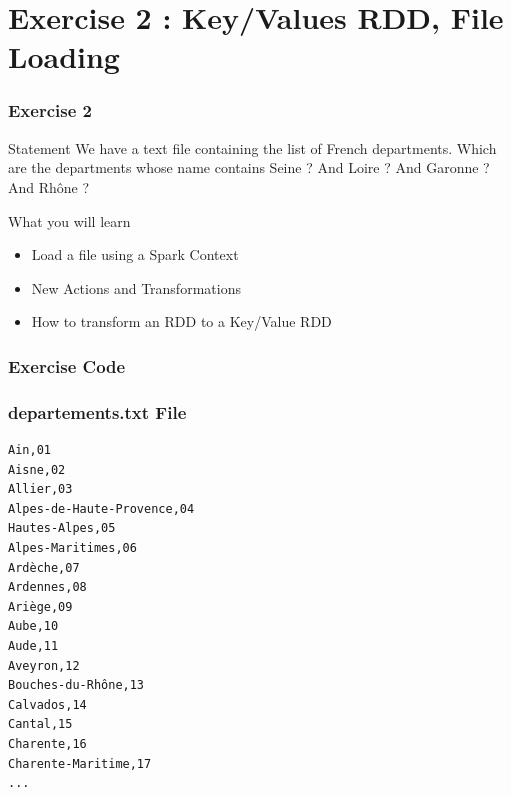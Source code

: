\documentclass[slidetop,9pt,utf8]{beamer}
\begin{document}
\section{Exercise 2 : Key/Values RDD, File Loading}


\begin{frame}
  \frametitle{Exercise 2}

  \begin{block}{Statement}
    We have a text file containing the list of French departments. Which are the departments whose name contains Seine ? And Loire ? And Garonne ? And Rhône ?
  \end{block}

  \begin{block}{What you will learn}
    \begin{itemize}
      \item Load a file using a Spark Context
      \item New Actions and Transformations
      \item How to transform an RDD to a Key/Value RDD
    \end{itemize}
  \end{block}

\end{frame}

\begin{frame}
  \frametitle{Exercise Code}

  

\end{frame}

\begin{frame}[fragile]
  \frametitle{departements.txt File}

  \begin{verbatim}
Ain,01
Aisne,02
Allier,03
Alpes-de-Haute-Provence,04
Hautes-Alpes,05
Alpes-Maritimes,06
Ardèche,07
Ardennes,08
Ariège,09
Aube,10
Aude,11
Aveyron,12
Bouches-du-Rhône,13
Calvados,14
Cantal,15
Charente,16
Charente-Maritime,17
...
  \end{verbatim}

\end{frame}
\end{document}
